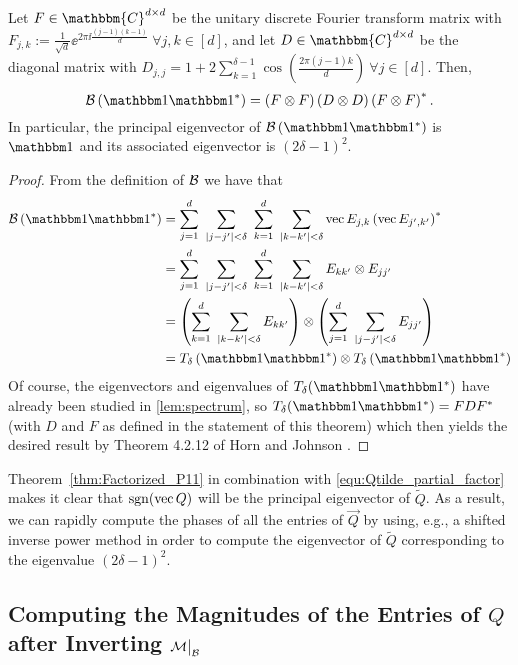 \begin{thm} 
Let $F \in \mathbbm{C}^{d \times d}$ be the unitary discrete Fourier transform matrix with $F_{j,k} := \frac{1}{\sqrt{d}} \ee^{2 \pi \ii \frac{(j-1)(k-1)}{d}} ~\forall j,k \in [d]$, and let $D \in \mathbbm{C}^{d \times d}$ be the diagonal matrix with $D_{j,j} = 1 + 2 \sum^{\delta-1}_{k=1} \cos \left( \frac{2 \pi (j-1)k}{d} \right)~\forall j \in [d]$.  Then,
$$\B \left( \one \one^* \right) = \left( F \otimes F \right) \left( D \otimes D \right) \left( F \otimes F \right)^*.$$
In particular, the principal eigenvector of $\B \left( \one \one^* \right)$ is $\one$ and its associated eigenvector is $(2 \delta - 1)^2$. 
\label{thm:Factorized_P11}
\end{thm}

\begin{proof}
From the definition of $\mathcal{B}$ we have that 
\begin{align*}
  \B \left( \one \one^* \right) &= \sum^d_{j=1} ~\sum_{|j - j'| < \delta} ~\sum^d_{k=1} ~\sum_{|k - k'| < \delta}\vec{E_{j,k}} \left(\vec{E_{j',k'}} \right)^* \\
  &= \sum^d_{j=1} ~\sum_{|j - j'| < \delta} ~\sum^d_{k=1} ~\sum_{|k - k'| < \delta} E_{kk'} \otimes E_{jj'} \\
  &= \left(\sum^d_{k=1} ~\sum_{|k - k'| < \delta} E_{kk'}\right) \otimes \left( \sum^d_{j=1} ~\sum_{|j - j'| < \delta} E_{jj'} \right) \\
  &= T_\delta\left(\one \one^*\right) \otimes T_\delta \left(\one \one^*\right)
\end{align*}
Of course, the eigenvectors and eigenvalues of $T_\delta(\one \one^*)$ have already been studied in \cref{lem:spectrum}, so $T_\delta(\one \one^*) = F D F^*$ (with $D$ and $F$ as defined in the statement of this theorem) which then yields the desired result by Theorem 4.2.12 of Horn and Johnson \cite{horn1991topics}.
\end{proof}

Theorem~\ref{thm:Factorized_P11} in combination with \eqref{equ:Qtilde_partial_factor} makes it clear that $\operatorname{sgn} (\operatorname{vec}{Q})$ will be the principal eigenvector of $\widetilde{Q}$.  As a result, we can rapidly compute the phases of all the entries of $\vec{Q}$ by using, e.g., a shifted inverse power method \cite{trefethen1997numerical} in order to compute the eigenvector of $\widetilde{Q}$ corresponding to the eigenvalue $(2 \delta - 1)^2$. 

\subsection{Computing the Magnitudes of the Entries of $Q$ after Inverting $\mathcal{M} \big|_{\mathcal{B}}$}
\label{sec:Getmags}

